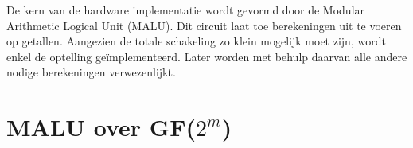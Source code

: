 
De kern van de hardware implementatie wordt gevormd door de Modular Arithmetic Logical Unit (MALU). Dit circuit laat toe berekeningen uit te voeren op getallen. Aangezien de totale schakeling zo klein mogelijk moet zijn, wordt enkel de optelling ge\"implementeerd. Later worden met behulp daarvan alle andere nodige berekeningen verwezenlijkt.



\section{MALU over GF($2^m$)}

\vspace{\textfloatsep}
\begin{minipage}{\linewidth}
    \begin{center}
      
    \endpgfgraphicnamed
    \label{fig-malu-core-basic}
    \end{center}
    \end{minipage}
\vspace{\textfloatsep}

\vspace{\textfloatsep}
\begin{minipage}{\linewidth}
    \begin{center}
      
    \endpgfgraphicnamed
    \label{fig-malu-core-basic}
    \end{center}
    \end{minipage}
\vspace{\textfloatsep}

\vspace{\textfloatsep}
\begin{minipage}{\linewidth}
    \begin{center}
      
    \endpgfgraphicnamed
    \label{fig-malu-wrapper-gf2m}
    \end{center}
    \end{minipage}
\vspace{\textfloatsep}
